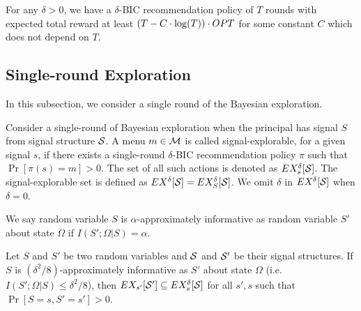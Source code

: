\begin{theorem}
\label{thm:private_nocc}
For any $\delta > 0$, we have a $\delta$-BIC recommendation policy of $T$ rounds with expected total reward at least $\left(T - C\cdot \log(T) \right) \cdot \OPT$ for some constant $C$ which does not depend on $T$. 
\end{theorem}


\subsection{Single-round Exploration}
\label{sec:private_single}

In this subsection, we consider a single round of the Bayesian exploration. 

\begin{definition}
Consider a single-round of Bayesian exploration when the principal has signal $S$ from signal structure $\S$. A menu $m \in \M$ is called signal-explorable, for a given signal $s$, if there exists a single-round $\delta$-BIC recommendation policy $\pi$ such that $\Pr[\pi(s) = m] > 0$. The set of all such actions is denoted as $\EX^{\delta}_s[\S]$. The signal-explorable set is defined as $\EX^{\delta}[\S] = \EX^{\delta}_S[\S]$. We omit $\delta$ in $\EX^{\delta}[\S]$ when $\delta = 0$. 
\end{definition}

\begin{definition}
We say random variable $S$ is $\alpha$-approximately informative as random variable $S'$ about state $\Omega$ if $I(S' ; \Omega|S) = \alpha$. 
\end{definition}

\begin{lemma} 
\label{lem:ainfomono}
Let $S$ and $S'$ be two random variables and $\S$ and $\S'$ be their signal structures. If $S$ is $(\delta^2/8)$-approximately informative as $S'$ about state $\Omega$ (i.e. $I(S' ; \Omega|S) \leq \delta^2/8$), then $\EX_{s'}[\S'] \subseteq \EX^{\delta}_s[\S]$  for all $s' ,s$ such that $\Pr[S= s, S'= s'] > 0$.
\end{lemma}

